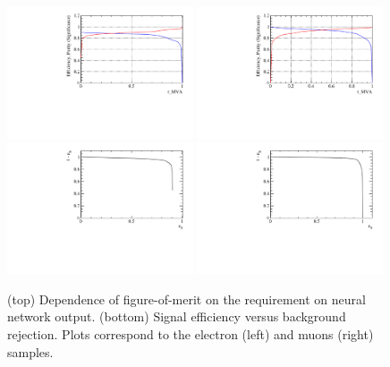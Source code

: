 %
%
\begin{figure}[h!]
\centering
\includegraphics[width=0.49\textwidth]{RKst/figs/Optimisation/optimizeCut_EE-q2central/EE_Optimize_t_MVA.pdf}
\includegraphics[width=0.49\textwidth]{RKst/figs/Optimisation/optimizeCut_MM-q2central/MM_Optimize_t_MVA.pdf}
\includegraphics[width=0.49\textwidth]{RKst/figs/Optimisation/optimizeCut_EE-q2central/EE_ROC_t_MVA.pdf}
\includegraphics[width=0.49\textwidth]{RKst/figs/Optimisation/optimizeCut_MM-q2central/MM_ROC_t_MVA.pdf}
\caption{(top) Dependence of figure-of-merit on the requirement on neural network output.
(bottom) Signal efficiency versus background rejection.
Plots correspond to the electron (left) and muons (right) samples.}
\label{fig:RKst_FOM}
\end{figure}

